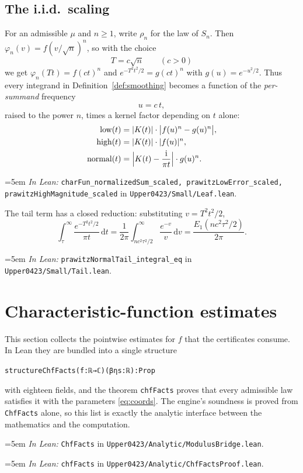 \documentclass[11pt,a4paper]{article}
\newenvironment{leancode}{\par\smallskip\begin{alltt}\small}{\end{alltt}\smallskip}
\theoremstyle{definition}
\newcommand{\ii}{\mathrm{i}}
\newcommand{\dd}{\,\mathrm{d}}
\newcommand{\Lean}[1]{\texttt{#1}}
\newcommand{\file}[1]{\texttt{#1}}
\newcommand{\formal}[2]{%
  \par\smallskip
  \begingroup\small\raggedright\emergencystretch=5em
  \noindent\textit{In Lean:} \Lean{#1} in \file{#2}.\par
  \endgroup\smallskip}
\begin{document}
\subsection{The i.i.d.\ scaling}

For an admissible $\mu$ and $n\ge1$, write $\rho_n$ for the law of $S_n$. Then
$\varphi_n(v)=f(v/\sqrt n)^n$, so with the choice
\begin{equation}
  \label{eq:Tscale}
  T=c\sqrt n \qquad (c>0)
\end{equation}
we get $\varphi_n(Tt)=f(ct)^n$ and $e^{-T^2t^2/2}=g(ct)^n$ with
$g(u)=e^{-u^2/2}$. Thus every integrand in Definition~\ref{def:smoothing} becomes
a function of the \emph{per-summand} frequency
\begin{equation}
  \label{eq:u}
  u=c\,t ,
\end{equation}
raised to the power $n$, times a kernel factor depending on $t$ alone:
\begin{equation}
  \label{eq:integrands}
  \begin{aligned}
    \text{low}(t) &= |K(t)|\cdot\bigl|f(u)^n-g(u)^n\bigr|,\\
    \text{high}(t) &= |K(t)|\cdot|f(u)|^n,\\
    \text{normal}(t) &= \Bigl|K(t)-\frac{\ii}{\pi t}\Bigr|\cdot g(u)^n .
  \end{aligned}
\end{equation}
\formal{charFun\_normalizedSum\_scaled, prawitzLowError\_scaled, prawitzHighMagnitude\_scaled}{Upper0423/Small/Leaf.lean}

The tail term has a closed reduction: substituting $v=T^2t^2/2$,
\begin{equation}
  \label{eq:tail}
  \int_\tau^\infty\frac{e^{-T^2t^2/2}}{\pi t}\dd t
  = \frac1{2\pi}\int_{nc^2\tau^2/2}^\infty\frac{e^{-v}}{v}\dd v
  = \frac{E_1(nc^2\tau^2/2)}{2\pi} .
\end{equation}
\formal{prawitzNormalTail\_integral\_eq}{Upper0423/Small/Tail.lean}

\section{Characteristic-function estimates}
\label{sec:chf}

This section collects the pointwise estimates for $f$ that the certificates
consume. In Lean they are bundled into a single structure
\begin{leancode}
structure ChfFacts (f : ℝ → ℂ) (β η s : ℝ) : Prop
\end{leancode}
with eighteen fields, and the theorem \Lean{chfFacts} proves that every admissible
law satisfies it with the parameters \eqref{eq:coords}. The engine's soundness is
proved from \Lean{ChfFacts} alone, so this list is exactly the analytic interface
between the mathematics and the computation.
\formal{ChfFacts}{Upper0423/Analytic/ModulusBridge.lean}
\formal{chfFacts}{Upper0423/Analytic/ChfFactsProof.lean}
\end{document}
